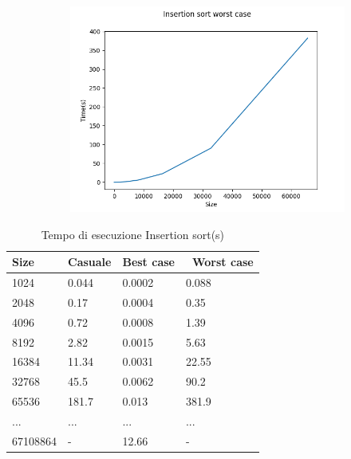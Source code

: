\documentclass[]{article}
\begin{document}
\begin{figure}[H]
\begin{subfigure}[b]{0.4\linewidth}
        \includegraphics[width=\textwidth]{InsertionSortWorstCase}
        \label{fig:insertion_worst}
    \end{subfigure}
\end{figure}

\begin{table}[H]
\centering
\caption{Tempo di esecuzione Insertion sort(s)}
\label{tab:insertion}
\begin{tabular}{|l|l|l|l|} 
\hline
Size     & Casuale & Best case & ~Worst case  \\ 
\hline
1024     & 0.044   & 0.0002    & 0.088        \\
2048     & 0.17    & 0.0004    & 0.35         \\
4096     & 0.72    & 0.0008    & 1.39         \\
8192     & 2.82    & 0.0015    & 5.63         \\
16384    & 11.34   & 0.0031    & 22.55        \\
32768    & 45.5    & 0.0062    & 90.2         \\
65536    & 181.7   & 0.013     & 381.9        \\
...      & ...     & ...       & ...          \\
67108864 & -       & 12.66     & -            \\
\hline
\end{tabular}
\end{table}
\end{document}
